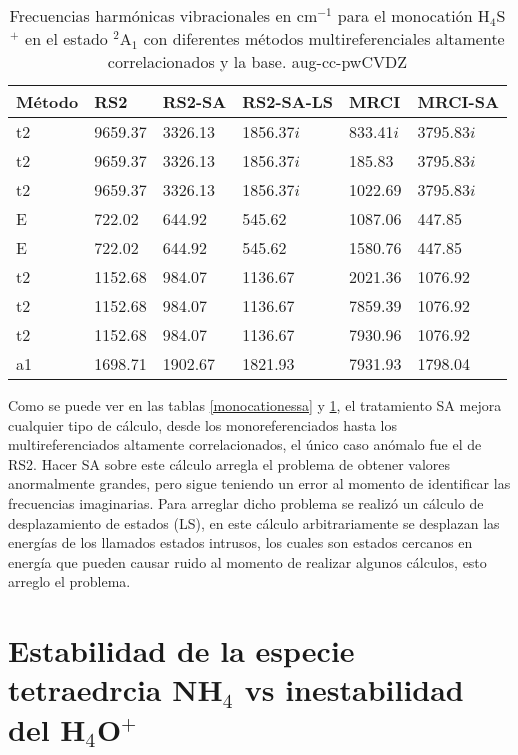 \documentclass[12pt]{report}
\begin{document}
\begin{table}[H]
\centering
\begin{tabular}{l|l|l|l|l|l}
\hline
Método & RS2 & RS2-SA & RS2-SA-LS & MRCI & MRCI-SA \\ \hline
t2 &9659.37  &3326.13  &1856.37$i$  & 833.41$i$ & 3795.83$i$ \\
t2 &9659.37  &3326.13  & 1856.37$i$  &185.83  & 3795.83$i$  \\
t2 &9659.37  &3326.13  &1856.37$i$   & 1022.69 & 3795.83$i$  \\
E  &722.02  & 644.92 & 545.62 &1087.06  & 447.85 \\
E  &722.02  & 644.92 & 545.62 & 1580.76 & 447.85 \\
t2 &1152.68  &984.07 & 1136.67 & 2021.36 & 1076.92 \\
t2 &1152.68  &984.07  & 1136.67 & 7859.39 &1076.92  \\
t2 &1152.68  & 984.07 &1136.67  & 7930.96 & 1076.92 \\
a1 &1698.71  &1902.67 & 1821.93 & 7931.93 &1798.04  \\ \hline
\end{tabular}
\caption{Frecuencias harmónicas vibracionales en cm$^{-1}$ para el monocatión H$_4$S$^+$ en el estado $^2$A$_1$ con diferentes métodos multireferenciales altamente correlacionados y la base. aug-cc-pwCVDZ}
\label{monocationessa2}
\end{table}

\newpage
Como se puede ver en las tablas \ref{monocationessa} y \ref{monocationessa2}, el tratamiento SA mejora cualquier tipo de cálculo, desde los monoreferenciados hasta los multireferenciados altamente correlacionados, el único caso anómalo fue el de RS2. Hacer SA sobre este cálculo arregla el problema de obtener valores anormalmente grandes, pero sigue teniendo un error al momento de identificar las frecuencias imaginarias. Para arreglar dicho problema se realizó un cálculo de desplazamiento de estados (LS), en este cálculo arbitrariamente se desplazan las energías de los llamados estados intrusos, los cuales son estados cercanos en energía que pueden causar ruido al momento de realizar algunos cálculos, esto arreglo el problema. 

\section{Estabilidad de la especie tetraedrcia NH$_4$ vs inestabilidad del H$_4$O$^+$}
\end{document}
